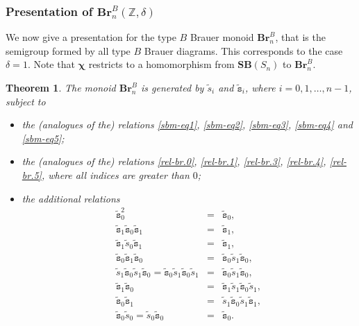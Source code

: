 \documentclass[a4paper]{amsart}
\newtheorem{theorem}{Theorem}
\begin{document}
\subsubsection{Presentation of $\mathbf{Br}_n^B(\mathbb{Z},\delta)$}\label{s4.4.6}


We now give a presentation for the type $B$ Brauer monoid $\mathbf{Br}_n^B$,
that is the semigroup formed by all type $B$ Brauer diagrams.
This corresponds to the case $\delta=1$. Note that
$\boldsymbol{\chi}$ restricts to a homomorphism from $\mathbf{SB}(S_n)$
to $\mathbf{Br}_n^B$.

\begin{theorem}\label{prop-4.4.6-1}
The monoid $\mathbf{Br}_n^B$ is generated by $\tilde{s}_i$ and 
$\tilde{\mathtt{s}}_i$, where $i=0,1,\dots,n-1$, subject to 
\begin{itemize}
\item the (analogues of the) relations \eqref{sbm-eq1}, 
\eqref{sbm-eq2}, \eqref{sbm-eq3}, \eqref{sbm-eq4} and \eqref{sbm-eq5}; 
\item the (analogues of the) relations \eqref{rel-br.0}, \eqref{rel-br.1}, 
\eqref{rel-br.3}, \eqref{rel-br.4}, \eqref{rel-br.5}, where all indices are 
greater than $0$;
\item the additional relations
\begin{eqnarray}
\tilde{\mathtt{s}}_0^2&=&\tilde{\mathtt{s}}_0,\label{rel-Bbr.0}\\
\tilde{\mathtt{s}}_1\tilde{\mathtt{s}}_0\tilde{\mathtt{s}}_1&=&\tilde{\mathtt{s}}_1,
\label{rel-Bbr.1}\\
\tilde{\mathtt{s}}_1\tilde{{s}}_0\tilde{\mathtt{s}}_1&=&\tilde{\mathtt{s}}_1,
\label{rel-Bbr.15}\\
\tilde{\mathtt{s}}_0\tilde{\mathtt{s}}_1\tilde{\mathtt{s}}_0&=&
\tilde{\mathtt{s}}_0 \tilde{s}_1\tilde{\mathtt{s}}_0,
\label{rel-Bbr.2}\\
\tilde{s}_1\tilde{\mathtt{s}}_0\tilde{s}_1\tilde{\mathtt{s}}_0=
\tilde{\mathtt{s}}_0\tilde{s}_1\tilde{\mathtt{s}}_0\tilde{s}_1&=&
\tilde{\mathtt{s}}_0 \tilde{s}_1\tilde{\mathtt{s}}_0,
\label{rel-Bbr.3}\\
\tilde{\mathtt{s}}_1\tilde{\mathtt{s}}_0&=&
\tilde{\mathtt{s}}_1 \tilde{s}_1\tilde{\mathtt{s}}_0\tilde{s}_1,
\label{rel-Bbr.4}\\
\tilde{\mathtt{s}}_0\tilde{\mathtt{s}}_1&=&
\tilde{s}_1\tilde{\mathtt{s}}_0\tilde{s}_1\tilde{\mathtt{s}}_1,
\label{rel-Bbr.5}\\
\tilde{\mathtt{s}}_0\tilde{s}_0=\tilde{s}_0\tilde{\mathtt{s}}_0&=&\tilde{\mathtt{s}}_0.
\label{rel-Bbr.6}
\end{eqnarray}
\end{itemize}
\end{theorem}
\end{document}
